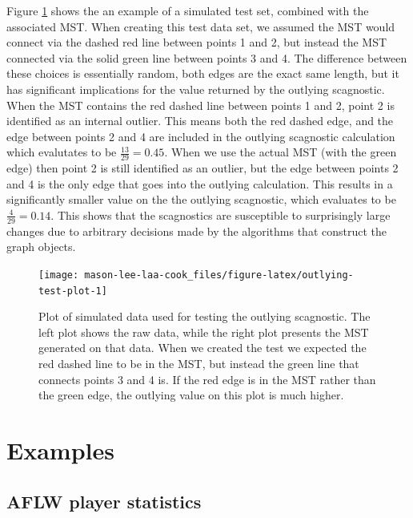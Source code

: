 Figure \ref{fig:outlying-test-plot} shows the an example of a simulated test set, combined with the associated MST. When creating this test data set, we assumed the MST would connect via the dashed red line between points 1 and 2, but instead the MST connected via the solid green line between points 3 and 4. The difference between these choices is essentially random, both edges are the exact same length, but it has significant implications for the value returned by the outlying scagnostic. When the MST contains the red dashed line between points 1 and 2, point 2 is identified as an internal outlier. This means both the red dashed edge, and the edge between points 2 and 4 are included in the outlying scagnostic calculation which evalutates to be \(\frac{13}{29}=0.45\). When we use the actual MST (with the green edge) then point 2 is still identified as an outlier, but the edge between points 2 and 4 is the only edge that goes into the outlying calculation. This results in a significantly smaller value on the the outlying scagnostic, which evaluates to be \(\frac{4}{29}=0.14\). This shows that the scagnostics are susceptible to surprisingly large changes due to arbitrary decisions made by the algorithms that construct the graph objects.

\begin{figure}
\texttt{[image: mason-lee-laa-cook\_files/figure-latex/outlying-test-plot-1]} \caption{Plot of simulated data used for testing the outlying scagnostic. The left plot shows the raw data, while the right plot presents the MST generated on that data. When we created the test we expected the red dashed line to be in the MST, but instead the green line that connects points 3 and 4 is. If the red edge is in the MST rather than the green edge, the outlying value on this plot is much higher.}\label{fig:outlying-test-plot}
\end{figure}

\section{Examples}\label{examples}

\subsection{AFLW player statistics}\label{aflw-player-statistics}

